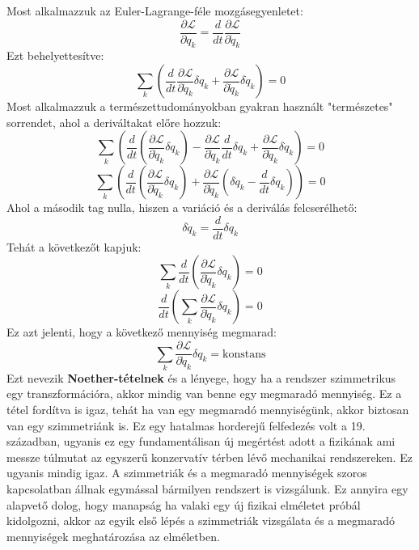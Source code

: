 \documentclass[../main.tex]{subfiles}
\begin{document}
Most alkalmazzuk az Euler-Lagrange-féle mozgásegyenletet:
\begin{equation}
    \frac{\partial \mathcal{L}}{\partial q_k} = \frac{d}{dt} \frac{\partial \mathcal{L}}{\partial \dot{q}_k}
\end{equation}
Ezt behelyettesítve:
\begin{equation}
    \sum_k \left( \frac{d}{dt} \frac{\partial \mathcal{L}}{\partial \dot{q}_k} \delta q_k + \frac{\partial \mathcal{L}}{\partial \dot{q}_k} \delta \dot{q}_k \right) = 0
\end{equation}
Most alkalmazzuk a természettudományokban gyakran használt "természetes" sorrendet, ahol a deriváltakat előre hozzuk:
\begin{equation}
    \sum_k \left( \frac{d}{dt} \left( \frac{\partial \mathcal{L}}{\partial \dot{q}_k} \delta q_k \right) - \frac{\partial \mathcal{L}}{\partial \dot{q}_k} \frac{d}{dt} \delta q_k + \frac{\partial \mathcal{L}}{\partial \dot{q}_k} \delta \dot{q}_k \right) = 0
\end{equation}
\begin{equation}
    \sum_k \left( \frac{d}{dt} \left( \frac{\partial \mathcal{L}}{\partial \dot{q}_k} \delta q_k \right) + \frac{\partial \mathcal{L}}{\partial \dot{q}_k} (\delta \dot{q}_k - \frac{d}{dt} \delta q_k) \right) = 0
\end{equation}
Ahol a második tag nulla, hiszen a variáció és a deriválás felcserélhető:
\begin{equation}
    \delta \dot{q}_k = \frac{d}{dt} \delta q_k
\end{equation}
Tehát a következőt kapjuk:
\begin{equation}
    \sum_k \frac{d}{dt} \left( \frac{\partial \mathcal{L}}{\partial \dot{q}_k} \delta q_k \right) = 0
\end{equation}
\begin{equation}
    \frac{d}{dt} \left( \sum_k \frac{\partial \mathcal{L}}{\partial \dot{q}_k} \delta q_k \right) = 0
\end{equation}
Ez azt jelenti, hogy a következő mennyiség megmarad:
\begin{equation}
    \sum_k \frac{\partial \mathcal{L}}{\partial \dot{q}_k} \delta q_k = \text{konstans}
\end{equation}
Ezt nevezik \textbf{Noether-tételnek} és a lényege, hogy ha a rendszer szimmetrikus egy transzformációra, akkor mindig van benne egy megmaradó mennyiség. Ez a tétel fordítva is igaz, tehát ha van egy megmaradó mennyiségünk, akkor biztosan van egy szimmetriánk is. Ez egy hatalmas horderejű felfedezés volt a 19. században, ugyanis ez egy fundamentálisan új megértést adott a fizikának ami messze túlmutat az egyszerű konzervatív térben lévő mechanikai rendszereken. Ez ugyanis mindig igaz. A szimmetriák és a megmaradó mennyiségek szoros kapcsolatban állnak egymással bármilyen rendszert is vizsgálunk. Ez annyira egy alapvető dolog, hogy manapság ha valaki egy új fizikai elméletet próbál kidolgozni, akkor az egyik első lépés a szimmetriák vizsgálata és a megmaradó mennyiségek meghatározása az elméletben.
\end{document}
